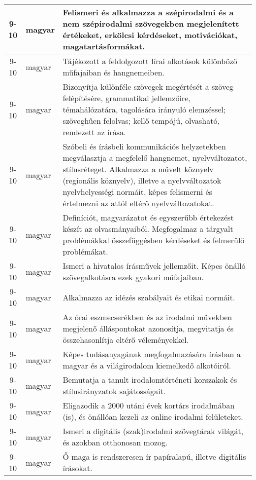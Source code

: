 \begin{small}
\begin{longtable}{c | p{2cm} |  p{11cm} }
              9-10 & magyar & Felismeri és alkalmazza a szépirodalmi és a nem szépirodalmi szövegekben megjelenített értékeket, erkölcsi kérdéseket, motivációkat, magatartásformákat. \\ \hline
              9-10 & magyar & Tájékozott a feldolgozott lírai alkotások különböző műfajaiban és hangnemeiben. \\ \hline
              9-10 & magyar & Bizonyítja különféle szövegek megértését a szöveg felépítésére, grammatikai jellemzőire, témahálózatára, tagolására irányuló elemzéssel; szöveghűen felolvas; kellő tempójú, olvasható, rendezett az írása.  \\ \hline
              9-10 & magyar & Szóbeli és írásbeli kommunikációs helyzetekben megválasztja a megfelelő hangnemet, nyelvváltozatot, stílusréteget. Alkalmazza a művelt köznyelv (regionális köznyelv), illetve a nyelvváltozatok nyelvhelyességi normáit, képes felismerni és értelmezni az attól eltérő nyelvváltozatokat. \\ \hline
              9-10 & magyar & Definíciót, magyarázatot és egyszerűbb értekezést készít az olvasmányaiból. Megfogalmaz a tárgyalt problémákkal összefüggésben kérdéseket és felmerülő problémákat. \\ \hline
              9-10 & magyar & Ismeri a hivatalos írásművek jellemzőit. Képes önálló szövegalkotásra ezek gyakori műfajaiban. \\ \hline
              9-10 & magyar & Alkalmazza az idézés szabályait és etikai normáit. \\ \hline
              9-10 & magyar & Az órai eszmecserékben és az irodalmi művekben megjelenő álláspontokat azonosítja, megvitatja és összehasonlítja eltérő véleményekkel. \\ \hline
              9-10 & magyar & Képes tudásanyagának megfogalmazására írásban a magyar és a világirodalom kiemelkedő alkotóiról. \\ \hline
              9-10 & magyar & Bemutatja a tanult irodalomtörténeti korszakok és stílusirányzatok sajátosságait. \\ \hline
              9-10 & magyar & Eligazodik a 2000 utáni évek kortárs irodalmában (is), és önállóan kezeli az online irodalmi felületeket. \\ \hline
              9-10 & magyar & Ismeri a digitális (szak)irodalmi szövegtárak világát, és azokban otthonosan mozog. \\ \hline
              9-10 & magyar & Ő maga is rendszeresen ír papíralapú, illetve digitális írásokat. \\ \hline

\end{longtable}
\end{small}

